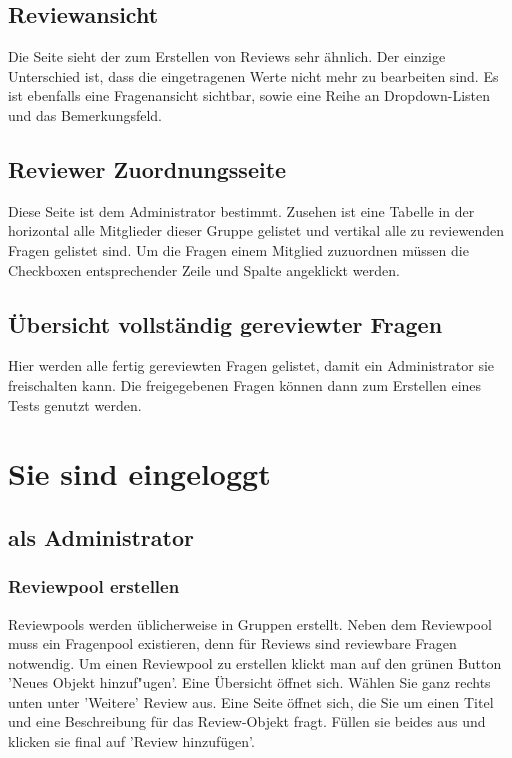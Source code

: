 \documentclass[12pt,a4paper]{scrreprt}
\begin{document}
\section{Reviewansicht}
Die Seite sieht der zum Erstellen von Reviews sehr ähnlich. Der einzige Unterschied ist, dass die eingetragenen Werte nicht mehr zu bearbeiten sind. Es ist ebenfalls eine Fragenansicht sichtbar, sowie  eine Reihe an Dropdown-Listen und das Bemerkungsfeld. 

\section{Reviewer Zuordnungsseite}
Diese Seite ist dem Administrator bestimmt. Zusehen ist eine Tabelle in der horizontal alle Mitglieder dieser Gruppe gelistet und vertikal alle zu reviewenden Fragen gelistet sind. Um die Fragen einem Mitglied zuzuordnen müssen die Checkboxen  entsprechender Zeile und Spalte angeklickt werden. 

\section{Übersicht vollständig gereviewter Fragen}
Hier werden alle fertig gereviewten Fragen gelistet, damit ein Administrator sie freischalten kann. Die freigegebenen Fragen können dann zum Erstellen eines Tests genutzt werden.


\chapter{Sie sind eingeloggt}

\section{als Administrator}
	
\subsection{Reviewpool erstellen}
Reviewpools werden üblicherweise in Gruppen erstellt. Neben dem Reviewpool muss ein Fragenpool existieren, denn für Reviews sind reviewbare Fragen notwendig. Um einen Reviewpool zu erstellen klickt man auf den grünen Button 'Neues Objekt hinzuf"ugen'. Eine Übersicht öffnet sich. Wählen Sie ganz rechts unten unter 'Weitere' Review aus. Eine Seite öffnet sich, die Sie um einen Titel und eine Beschreibung für das Review-Objekt fragt. Füllen sie beides aus und klicken sie final auf 'Review hinzufügen'.
		
\end{document}
